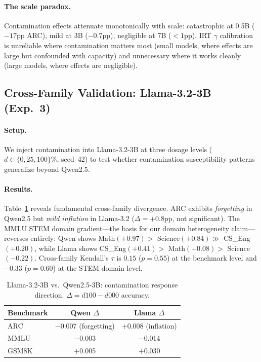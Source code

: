 \documentclass[11pt,a4paper]{article}
\newcommand{\gam}{\gamma}
\begin{document}
\paragraph{The scale paradox.}
Contamination effects attenuate monotonically with scale: catastrophic at 0.5B ($-17$pp ARC), mild at 3B ($-0.7$pp), negligible at 7B ($< 1$pp).
IRT $\gam$ calibration is unreliable where contamination matters most (small models, where effects are large but confounded with capacity) and unnecessary where it works cleanly (large models, where effects are negligible).

\subsection{Cross-Family Validation: Llama-3.2-3B (Exp.~3)}
\label{sec:exp_family}

\paragraph{Setup.}
We inject contamination into Llama-3.2-3B at three dosage levels ($d \in \{0, 25, 100\}\%$, seed~42) to test whether contamination susceptibility patterns generalize beyond Qwen2.5.

\paragraph{Results.}
Table~\ref{tab:cross_family} reveals fundamental cross-family divergence.
ARC exhibits \emph{forgetting} in Qwen2.5 but \emph{mild inflation} in Llama-3.2 ($\Delta = +0.8$pp, not significant).
The MMLU STEM domain gradient---the basis for our domain heterogeneity claim---reverses entirely: Qwen shows Math$(+0.97) >$ Science$(+0.84) \gg$ CS\_Eng$(+0.20)$, while Llama shows CS\_Eng$(+0.41) >$ Math$(+0.08) >$ Science$(-0.22)$.
Cross-family Kendall's $\tau$ is $0.15$ ($p = 0.55$) at the benchmark level and $-0.33$ ($p = 0.60$) at the STEM domain level.

\begin{table}[t]
\centering
\small
\caption{Llama-3.2-3B vs.\ Qwen2.5-3B: contamination response direction. $\Delta = d100 - d000$ accuracy.}
\label{tab:cross_family}
\begin{tabular}{lcc}
\toprule
\textbf{Benchmark} & Qwen $\Delta$ & Llama $\Delta$ \\
\midrule
ARC   & $-$0.007 (forgetting)   & $+$0.008 (inflation) \\
MMLU  & $-$0.003                & $-$0.014 \\
GSM8K & $+$0.005                & $+$0.030 \\
\bottomrule
\end{tabular}
\end{table}
\end{document}

